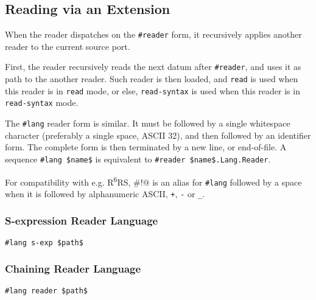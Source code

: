 \subsection{Reading via an Extension}
\label{subsec:aml-base-lang-reader-extension}

When the reader dispatches on the \lstinline!#reader! form, it recursively applies another reader to the current source port. 


First, the reader recursively reads the next datum after \lstinline!#reader!, and uses it as path to the another reader. Such reader is then loaded, and \lstinline!read! is used when this reader is in \lstinline!read! mode, or else, \lstinline!read-syntax! is used when this reader is in \lstinline!read-syntax! mode.

The \lstinline!#lang! reader form is similar. It must be followed by a single whitespace character (preferably a single space, ASCII 32), and then followed by an identifier form. The complete form is then terminated by a new line, or end-of-file. A sequence \lstinline!#lang $name$! is equivalent to \lstinline!#reader $name$.Lang.Reader!. 


For compatibility with e.g. R\textsuperscript{6}RS, \lstinline@#!@ is an alias for \lstinline!#lang! followed by a space when it is followed by alphanumeric ASCII, \lstinline!+!, \lstinline!-! or \lstinline!_!. 





\subsubsection{S-expression Reader Language}


\begin{lstlisting}
#lang s-exp $path$
\end{lstlisting}





\subsubsection{Chaining Reader Language}


\begin{lstlisting}
#lang reader $path$
\end{lstlisting}







